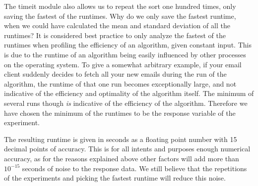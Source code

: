 The timeit module also allows us to repeat the sort one hundred times, only saving the fastest of the runtimes. Why do we only save the fastest runtime, when we could have calculated the mean and standard deviation of all the runtimes? It is considered best practice to only analyze the fastest of the runtimes when profiling the efficiency of an algorithm, given constant input. This is due to the runtime of an algorithm being easily influenced by other processes on the operating system. To give a somewhat arbitrary example, if your email client suddenly decides to fetch all your new emails during the run of the algorithm, the runtime of that one run becomes exceptionally large, and not indicative of the efficiency and optimality of the algorithm itself. The minimum of several runs though \textit{is} indicative of the efficiency of the algorithm. Therefore we have chosen the minimum of the runtimes to be the response variable of the experiment.

The resulting runtime is given in seconds as a floating point number with 15 decimal points of accuracy. This is for all intents and purposes enough numerical accuracy, as for the reasons explained above other factors will add more than $10^{-15}$ seconds of noise to the response data. We still believe that the repetitions of the experiments and picking the fastest runtime will reduce this noise.